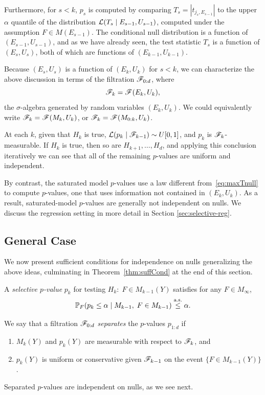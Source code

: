 \documentclass{article}
\begin{document}
Furthermore, for $s<k$, $p_s$ is computed by comparing $T_s=|t_{j_s, E_{s-1}}|$ to the upper $\alpha$ quantile of the distribution $\mathcal{L}(T_s \mid E_{s-1}, U_{s-1})$, computed under the assumption $F\in M(E_{s-1})$. The conditional null distribution is a function of $(E_{s-1}, U_{s-1})$, and as we have already seen, the test statistic $T_s$ is a function of $(E_s, U_s)$, both of which are functions of $(E_{k-1},U_{k-1})$.

Because $(E_s,U_s)$ is a function of $(E_k,U_k)$ for $s<k$, we can characterize the above discussion in terms of the filtration $\mathscr{F}_{0:d}$, where
\[
\mathscr{F}_k = \mathscr{F}(E_k, U_k),
\]
the $\sigma$-algebra generated by random variables $(E_k, U_k)$. We could equivalently write $\mathscr{F}_k=\mathscr{F}(M_k, U_k)$, or $\mathscr{F}_k=\mathscr{F}(M_{0:k}, U_k)$.

At each $k$, given that $H_k$ is true, $\mathcal{L}(p_k \mid \mathscr{F}_{k-1})\sim U[0,1]$, and $p_k$ is $\mathscr{F}_k$-measurable. If $H_k$ is true, then so are $H_{k+1},\ldots, H_d$, and applying this conclusion iteratively we can see that all of the remaining $p$-values are uniform and independent.

By contrast, the saturated model $p$-values use a law different from~\eqref{eq:maxTnull} to compute $p$-values, one that uses
information not contained in $(E_k,U_k)$. As a result, saturated-model $p$-values are generally not independent on nulls. We discuss the regression setting in more detail in Section \ref{sec:selective-reg}.

\subsection{General Case}

We now present sufficient conditions for independence on nulls generalizing the above ideas, culminating in Theorem~\ref{thm:suffCond} at the end of this section.

A {\em selective $p$-value} $p_k$ for testing $H_k:\; F \in M_{k-1}(Y)$ satisfies for any $F\in M_{\infty}$,
\[
\mathbb{P}_F(p_k \leq \alpha \mid M_{k-1},\; F\in M_{k-1}) \overset{\textrm{a.s.}}{\leq} \alpha.
\]

We say that a filtration $\mathscr{F}_{0:d}$ {\em separates} the $p$-values $p_{1:d}$ if
\begin{enumerate}
\item $M_k(Y)$ and $p_k(Y)$ are measurable with respect to $\mathscr{F}_k$, and 
\item $p_k(Y)$ is uniform or conservative given $\mathscr{F}_{k-1}$ on the event $\{F\in M_{k-1}(Y)\}$.
\end{enumerate}
Separated $p$-values are independent on nulls, as we see next.
\end{document}
